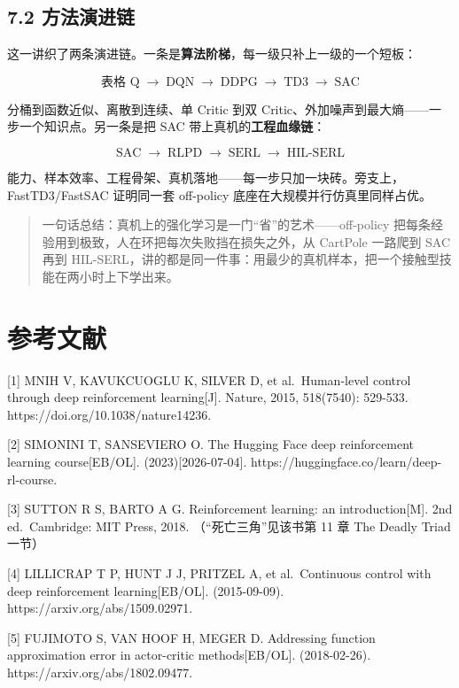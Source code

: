 \documentclass[
  chinese,
]{ctexart}
\begin{document}
\subsection{7.2 方法演进链}\label{ux65b9ux6cd5ux6f14ux8fdbux94fe}

这一讲织了两条演进链。一条是\textbf{算法阶梯}，每一级只补上一级的一个短板：

\[\text{表格 Q} \;\to\; \text{DQN} \;\to\; \text{DDPG} \;\to\; \text{TD3} \;\to\; \text{SAC}\]

分桶到函数近似、离散到连续、单 Critic 到双
Critic、外加噪声到最大熵------一步一个知识点。另一条是把 SAC
带上真机的\textbf{工程血缘链}：

\[\text{SAC} \;\to\; \text{RLPD} \;\to\; \text{SERL} \;\to\; \text{HIL-SERL}\]

能力、样本效率、工程骨架、真机落地------每一步只加一块砖。旁支上，FastTD3/FastSAC
证明同一套 off-policy 底座在大规模并行仿真里同样占优。

\begin{quote}
一句话总结：真机上的强化学习是一门``省''的艺术------off-policy
把每条经验用到极致，人在环把每次失败挡在损失之外，从 CartPole 一路爬到
SAC 再到
HIL-SERL，讲的都是同一件事：用最少的真机样本，把一个接触型技能在两小时上下学出来。
\end{quote}

\section{参考文献}\label{ux53c2ux8003ux6587ux732e}

{[}1{]} MNIH V, KAVUKCUOGLU K, SILVER D, et al.~Human-level control
through deep reinforcement learning{[}J{]}. Nature, 2015, 518(7540):
529-533. https://doi.org/10.1038/nature14236.

{[}2{]} SIMONINI T, SANSEVIERO O. The Hugging Face deep reinforcement
learning course{[}EB/OL{]}. (2023){[}2026-07-04{]}.
https://huggingface.co/learn/deep-rl-course.

{[}3{]} SUTTON R S, BARTO A G. Reinforcement learning: an
introduction{[}M{]}. 2nd ed.~Cambridge: MIT Press, 2018.
（``死亡三角''见该书第 11 章 The Deadly Triad 一节）

{[}4{]} LILLICRAP T P, HUNT J J, PRITZEL A, et al.~Continuous control
with deep reinforcement learning{[}EB/OL{]}. (2015-09-09).
https://arxiv.org/abs/1509.02971.

{[}5{]} FUJIMOTO S, VAN HOOF H, MEGER D. Addressing function
approximation error in actor-critic methods{[}EB/OL{]}. (2018-02-26).
https://arxiv.org/abs/1802.09477.
\end{document}
